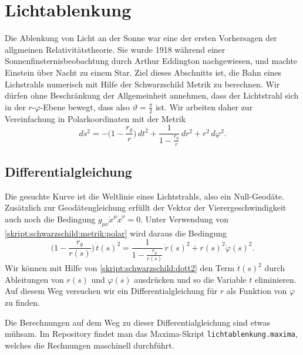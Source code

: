 %
%
%
\section{Lichtablenkung}
Die Ablenkung von Licht an der Sonne war eine der ersten Vorhersagen der
allgmeinen Relativitätstheorie.
Sie wurde 1918 während einer Sonnenfinsternisbeobachtung durch
Arthur Eddington nachgewiesen, und machte Einstein über Nacht zu einem Star.
Ziel dieses Abschnitts ist, die Bahn eines Lichstrahls numerisch
mit Hilfe der Schwarzschild Metrik zu berechnen.
Wir dürfen ohne Beschränkung der Allgemeinheit annehmen, dass der Lichtstrahl
sich in der $r$-$\varphi$-Ebene bewegt, dass also $\vartheta=\frac\pi2$ ist.
Wir arbeiten daher zur Vereinfachung in Polarkoordinaten mit der Metrik
\begin{equation}
ds^2
=
-\biggl(1-\frac{r_g}{r}\biggr)\,dt^2
+ \frac{1}{\displaystyle 1-\frac{r_g}{r}}\,dr^2
+ r^2\,d\varphi^2.
\label{skript:schwarzschild:metrik:polar}
\end{equation}

\subsection{Differentialgleichung}
Die gesuchte Kurve ist die Weltlinie eines Lichtstrahls, also ein Null-Geodäte. 
Zusätzlich zur Geodätengleichung erfüllt der Vektor der Vierergeschwindigkeit
auch noch die Bedingung $g_{\mu\nu}\dot x^\mu \dot x^\nu=0$.
Unter Verwendung von \eqref{skript:schwarzschild:metrik:polar}
wird daraus die Bedingung
\begin{equation}
\biggl(1-\frac{r_g}{r(s)}\biggr)\,\dot t(s)^2
=
\frac{1}{\displaystyle 1-\frac{r_g}{r(s)}}\,\dot r(s)^2
+ r(s)^2\dot \varphi(s)^2.
\label{skript:schwarzschild:dott2}
\end{equation}
Wir können mit Hilfe von \eqref{skript:schwarzschild:dott2}
den Term $\dot t(s)^2$ durch Ableitungen von $r(s)$ und $\varphi(s)$
ausdrücken und so die Variable $t$ eliminieren.
Auf diesem Weg versuchen wir ein Differentialgleichung für $r$
als Funktion von $\varphi$ zu finden.

Die Berechnungen auf dem Weg zu dieser Differentialgleichung sind
etwas mühsam.
Im Repository findet man das Maxima-Skript \texttt{lichtablenkung.maxima},
welches die Rechnungen maschinell durchführt.

